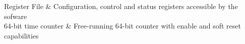 Register File & Configuration, control and status registers accessible by the sofware \vspace{2mm} \\ \hline
{}
64-bit time counter & Free-running 64-bit counter with enable and soft reset capabilities \vspace{2mm} \\ \hline
